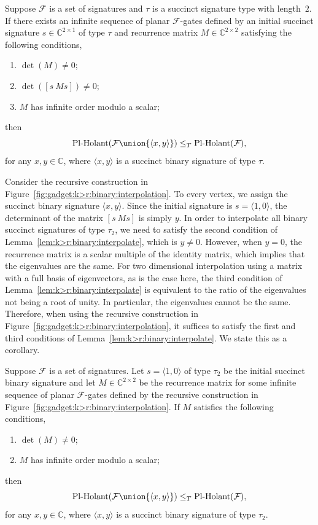 \documentclass[11pt]{article}
\newcommand{\PlHolant}{\operatorname{Pl-Holant}}
\begin{document}
\begin{lemma} \label{lem:k>r:binary:interpolate}
 Suppose $\mathcal{F}$ is a set of signatures and $\tau$ is a succinct signature type with length~$2$.
 If there exists an infinite sequence of planar $\mathcal{F}$-gates defined by an initial succinct signature $s \in \mathbb{C}^{2 \times 1}$ of type $\tau$
 and recurrence matrix $M \in \mathbb{C}^{2 \times 2}$ satisfying the following conditions,
 \begin{enumerate}
  \item $\det(M) \ne 0$;
  \item $\det([s\ M s]) \ne 0$;
  \item $M$ has infinite order modulo a scalar;
 \end{enumerate}
 then
 \[
  \PlHolant(\mathcal{F} \union \{\langle x,y \rangle\}) \le_T \PlHolant(\mathcal{F}),
 \]
 for any $x,y \in \mathbb{C}$,
 where $\langle x,y \rangle$ is a succinct binary signature of type $\tau$.
\end{lemma}

Consider the recursive construction in Figure~\ref{fig:gadget:k>r:binary:interpolation}.
To every vertex,
we assign the succinct binary signature $\langle x,y \rangle$.
Since the initial signature is $s = \langle 1,0 \rangle$,
the determinant of the matrix $[s\ M s]$ is simply $y$.
In order to interpolate all binary succinct signatures of type $\tau_2$,
we need to satisfy the second condition of Lemma~\ref{lem:k>r:binary:interpolate},
which is $y \ne 0$.
However, when $y = 0$, the recurrence matrix is a scalar multiple of the identity matrix,
which implies that the eigenvalues are the same.
For two dimensional interpolation using a matrix with a full basis of eigenvectors, as is the case here,
the third condition of Lemma~\ref{lem:k>r:binary:interpolate} is equivalent to the ratio of the eigenvalues not being a root of unity.
In particular,
the eigenvalues cannot be the same.
Therefore, when using the recursive construction in Figure~\ref{fig:gadget:k>r:binary:interpolation},
it suffices to satisfy the first and third conditions of Lemma~\ref{lem:k>r:binary:interpolate}.
We state this as a corollary.

\begin{corollary} \label{cor:k>r:binary:interpolate}
 Suppose $\mathcal{F}$ is a set of signatures.
 Let $s = \langle 1,0 \rangle$ of type $\tau_2$ be the initial succinct binary signature
 and let $M \in \mathbb{C}^{2 \times 2}$ be the recurrence matrix
 for some infinite sequence of planar $\mathcal{F}$-gates defined by the recursive construction in Figure~\ref{fig:gadget:k>r:binary:interpolation}.
 If $M$ satisfies the following conditions,
 \begin{enumerate}
  \item $\det(M) \ne 0$;
  \item $M$ has infinite order modulo a scalar;
 \end{enumerate}
 then
 \[
  \PlHolant(\mathcal{F} \union \{\langle x,y \rangle\}) \le_T \PlHolant(\mathcal{F}),
 \]
 for any $x,y \in \mathbb{C}$,
 where $\langle x,y \rangle$ is a succinct binary signature of type $\tau_2$.
\end{corollary}
\end{document}
